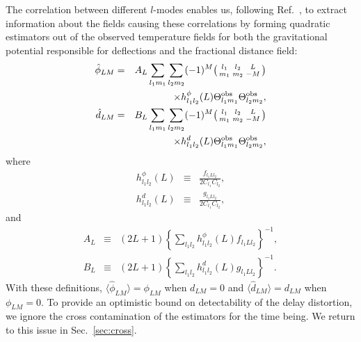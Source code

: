\documentclass[prd,amsmath,amssymb,floatfix,superscriptaddress,nofootinbib,twocolumn]{revtex4-1}
\def\bea{\begin{eqnarray}}
\def\eea{\end{eqnarray}}
\newcommand{\eql}[1]{\label{eq:#1}}
\newcommand{\scott}[1]{{\color{darkgreen} #1}}
\newcommand{\peikai}[1]{{\color{blue} #1}}
\newcommand{\wh}[1]{{\color{red} #1}}
\begin{document}
The correlation between different $l$-modes enables us, following Ref.~\cite{Okamoto:2003zw}, to extract information about the fields causing these correlations by forming quadratic estimators out of the observed temperature fields for both the gravitational potential responsible for deflections and the fractional distance field:
\bea
\hat \phi_{LM} &=& A_L 
\sum_{l_1m_1}\sum_{l_2m_2} 
 (-1)^M  \bigl(\begin{smallmatrix} l_1 & l_2 & L \\ m_1 & m_2 & -M  \end{smallmatrix}\bigr) 
 \nonumber \\  && \times 
 h^{\phi}_{l_1l_2}(L)  \tob_{l_1m_1} \tob_{l_2m_2}, \nonumber \\
\hat d_{LM} &=& B_{L} \sum_{l_1m_1}\sum_{l_2m_2}
(-1)^M  \bigl(\begin{smallmatrix} l_1 & l_2 & L \\ m_1 & m_2 & -M  \end{smallmatrix}\bigr) 
\nonumber \\ && \times
h^{d}_{l_1l_2}(L)  \tob_{l_1m_1} \tob_{l_2m_2}, \eql{distest}
\eea
where
\bea
h^{\phi}_{l_1l_2}(L)&\equiv& \frac{f_{l_1Ll_2}}{2C_{l_1}C_{l_2}} ,\nonumber\\
h^{d}_{l_1l_2}(L)&\equiv& \frac{g_{l_1Ll_2}}{2C_{l_1}C_{l_2}},
\eea
and %
\bea
A_L &\equiv& 
(2L+1)
 \left\{ \sum_{l_1l_2} h^{\phi}_{l_1l_2}(L)f_{l_1Ll_2}\right\}^{-1},\nonumber\\
B_L &\equiv& (2L+1) \left\{ \sum_{l_1l_2} h^{d}_{l_1l_2}(L)g_{l_1Ll_2}\right\}^{-1}.\eql{bt}
\eea 
With these definitions, 
$\langle \hat\phi_{LM} \rangle = \phi_{LM}$ when $d_{LM}=0$ and
$\langle \hat d _{LM} \rangle = d_{LM}$ when $\phi_{LM}=0$.  To provide an optimistic bound
on detectability of the delay distortion, we ignore the cross contamination of the estimators for the time being. We return to this  issue in Sec.~\ref{sec:cross}.


\end{document}
